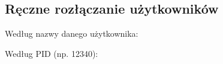 \documentclass[a4paper,11pt,polish]{sphinxmanual}
\begin{document}
\subsection{Ręczne rozłączanie użytkowników}
\label{\detokenize{Kontrola_i_konserwacja/kontrola_i_konserwacja:reczne-rozlaczanie-uzytkownikow}}
\sphinxAtStartPar
Według nazwy danego użytkownika:
\begin{quote}

\begin{sphinxVerbatim}[commandchars=\\\{\}]
\end{sphinxVerbatim}
\end{quote}

\sphinxAtStartPar
Według PID (np. 12340):
\begin{quote}

\begin{sphinxVerbatim}[commandchars=\\\{\}]
\end{sphinxVerbatim}
\end{quote}
\end{document}
